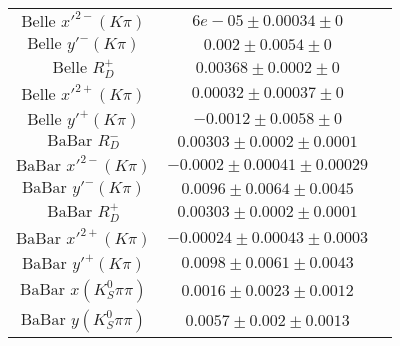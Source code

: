 \begin{table}[htdp]
\begin{center}
\begin{tabular}{|c|c|c|}
$\text{Belle } x'^{2-}(K \pi)$ & $6e-05\pm0.00034\pm0$ & \\
$\text{Belle } y'^-(K \pi)$ & $0.002\pm0.0054\pm0$ & \\
$\text{Belle } R_D^+$ & $0.00368\pm0.0002\pm0$ & \\
$\text{Belle } x'^{2+}(K \pi)$ & $0.00032\pm0.00037\pm0$ & \\
$\text{Belle } y'^+(K \pi)$ & $-0.0012\pm0.0058\pm0$ & \\
\hline
$\text{BaBar } R_D^-$ & $0.00303\pm0.0002\pm0.0001$ & \\
$\text{BaBar } x'^{2-}(K \pi)$ & $-0.0002\pm0.00041\pm0.00029$ & \\
$\text{BaBar } y'^-(K \pi)$ & $0.0096\pm0.0064\pm0.0045$ & \\
$\text{BaBar } R_D^+$ & $0.00303\pm0.0002\pm0.0001$ & \\
$\text{BaBar } x'^{2+}(K \pi)$ & $-0.00024\pm0.00043\pm0.0003$ & \\
$\text{BaBar } y'^+(K \pi)$ & $0.0098\pm0.0061\pm0.0043$ & \\
\hline
$\text{BaBar } x(K_S^0\pi\pi)$ & $0.0016\pm0.0023\pm0.0012$ & \\
$\text{BaBar } y(K_S^0\pi\pi)$ & $0.0057\pm0.002\pm0.0013$ & \\
\hline
\end{tabular}
\end{center}
\label{table:allcpv_inputs}
\end{table}
